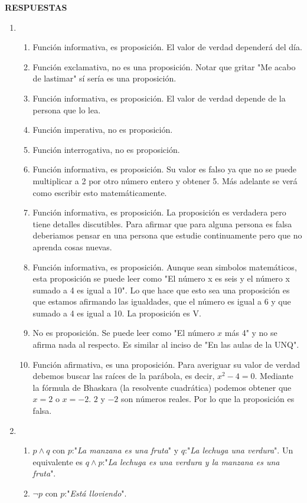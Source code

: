 \documentclass[a4paper]{article}
\newcommand{\exercise}{\item}
\begin{document}
 \textbf{RESPUESTAS}\begin{enumerate}\exercise\begin{enumerate} [label=(\alph*)]		\item Función informativa, es proposición. El valor de verdad dependerá del día.
		\item Función exclamativa, no es una proposición. Notar que gritar "Me acabo de lastimar" sí sería es una proposición.
		\item Función informativa, es proposición. El valor de verdad depende de la persona que lo lea.
		\item Función imperativa, no es proposición.
		\item Función interrogativa, no es proposición.
		\item Función informativa, es proposición. Su valor es falso ya que no se puede multiplicar a 2 por otro número entero y obtener 5. Más adelante se verá como escribir esto matemáticamente.
		\item Función informativa, es proposición. La proposición es verdadera pero tiene detalles discutibles. Para afirmar que para alguna persona es falsa deberiamos pensar en una persona que estudie continuamente pero que no aprenda cosas nuevas.
		\item Función informativa, es proposición. Aunque sean simbolos matemáticos, esta proposición se puede leer como "El número x es seis y el número x sumado a 4 es igual a 10". Lo que hace que esto sea una proposición es que estamos afirmando las igualdades, que el número es igual a 6 y que sumado a 4 es igual a 10. La proposición es V.
		\item No es proposición. Se puede leer como "El número $x$ más 4" y no se afirma nada al respecto. Es similar al inciso de "En las aulas de la UNQ".
		\item Función afirmativa, es una proposición. Para averiguar su valor de verdad debemos buscar las raíces de la parábola, es decir, $x^2-4=0$. Mediante la fórmula de Bhaskara (la resolvente cuadrática) podemos obtener que $x=2$ o $x=-2$. $2$ y $-2$ son números reales. Por lo que la proposición es falsa. 
\end{enumerate}\exercise\begin{enumerate} [label=(\alph*)]		\item $p \land q$ con $p$:"\textit{La manzana es una fruta}" y $q$:"\textit{La lechuga una verdura}". Un equivalente es $q \land p$:"\textit{La lechuga es una verdura y la manzana es una fruta}".
		\item $\neg p$ con $p$:"\textit{Está lloviendo}".

\end{enumerate}
\end{enumerate}
\end{document}
